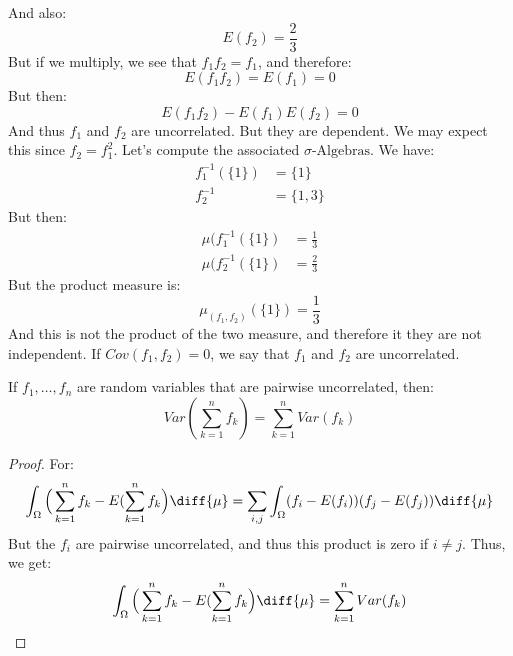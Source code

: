         And also:
        \begin{equation}
            E(f_{2})=\frac{2}{3}
        \end{equation}
        But if we multiply, we see that
        $f_{1}f_{2}=f_{1}$, and therefore:
        \begin{equation}
            E(f_{1}f_{2})=E(f_{1})=0
        \end{equation}
        But then:
        \begin{equation}
            E(f_{1}f_{2})-E(f_{1})E(f_{2})=0
        \end{equation}
        And thus $f_{1}$ and $f_{2}$ are uncorrelated.
        But they are dependent. We may expect this since
        $f_{2}=f_{1}^{2}$. Let's compute the associated
        $\sigma\textrm{-Algebras}$. We have:
        \begin{align}
            f_{1}^{\minus{1}}(\{1\})
            &=\{1\}\\
            f_{2}^{\minus{1}}&=\{1,3\}
        \end{align}
        But then:
        \begin{align}
            \mu(f_{1}^{\minus{1}}(\{1\})
            &=\frac{1}{3}\\
            \mu(f_{2}^{\minus{1}}(\{1\})&=\frac{2}{3}
        \end{align}
        But the product measure is:
        \begin{equation}
            \mu_{(f_{1},f_{2})}(\{1\})=\frac{1}{3}
        \end{equation}
        And this is not the product of the two measure, and
        therefore it they are not independent.
        If $Cov(f_{1},f_{2})=0$, we say that $f_{1}$ and
        $f_{2}$ are uncorrelated.
        \begin{theorem}
            If $f_{1},\dots,f_{n}$ are random variables
            that are pairwise uncorrelated, then:
            \begin{equation}
                Var(\sum_{k=1}^{n}f_{k})=
                \sum_{k=1}^{n}Var(f_{k})
            \end{equation}
        \end{theorem}
        \begin{proof}
            For:
            \begin{equation}
                \int_{\Omega}
                    \Big(\sum_{k=1}^{n}f_{k}-
                        E(\sum_{k=1}^{n}f_{k}\Big)\diff{\mu}
                =\sum_{i,j}\int_{\Omega}
                    (f_{i}-E(f_{i}))(f_{j}-E(f_{j}))\diff{\mu}
            \end{equation}
            But the $f_{i}$ are pairwise uncorrelated, and
            thus this product is zero if $i\ne{j}$. Thus, we
            get:
            \begin{equation}
                \int_{\Omega}
                    \Big(\sum_{k=1}^{n}f_{k}-
                        E(\sum_{k=1}^{n}f_{k}\Big)\diff{\mu}
                =\sum_{k=1}^{n}Var(f_{k})
            \end{equation}
        \end{proof}
